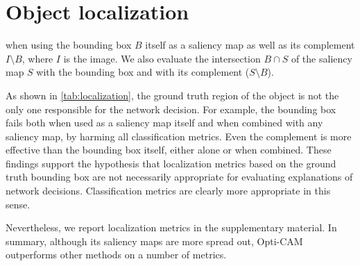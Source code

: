 \section{Object localization}
\label{sec:oc_loc}
 when using the bounding box $B$ itself as a saliency map as well as its complement $I \setminus B$, where $I$ is the image. We also evaluate the intersection $B \cap S$ of the saliency map $S$ with the bounding box and with its complement ($S \setminus B$).

As shown in \autoref{tab:localization}, the ground truth region of the object is not the only one responsible for the network decision. For example, the bounding box fails both when used as a saliency map itself and when combined with any saliency map, by harming all classification metrics. Even the complement is more effective than the bounding box itself, either alone or when combined. These findings support the hypothesis that localization metrics based on the ground truth bounding box are not necessarily appropriate for evaluating explanations of network decisions. Classification metrics are clearly more appropriate in this sense.

Nevertheless, we report localization metrics in the supplementary material. In summary, although its saliency maps are more spread out, Opti-CAM outperforms other methods on a number of metrics.


